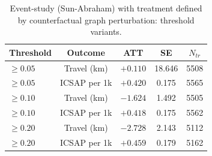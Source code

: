 \begin{table}[h!]
\centering
\caption{Event-study (Sun-Abraham) with treatment defined by counterfactual graph perturbation: threshold variants.}
\label{tab:es-perturbation}
\small
\begin{tabular}{lcccc}
\toprule
Threshold & Outcome & ATT & SE & $N_{tr}$ \\
\midrule
$\geq 0.05$ & Travel (km) & $+0.110$ & 18.646 & 5508 \\
$\geq 0.05$ & ICSAP per 1k & $+0.420$ & 0.175 & 5565 \\
$\geq 0.10$ & Travel (km) & $-1.624$ & 1.492 & 5505 \\
$\geq 0.10$ & ICSAP per 1k & $+0.418$ & 0.175 & 5562 \\
$\geq 0.20$ & Travel (km) & $-2.728$ & 2.143 & 5112 \\
$\geq 0.20$ & ICSAP per 1k & $+0.459$ & 0.179 & 5162 \\
\bottomrule
\end{tabular}
\end{table}

